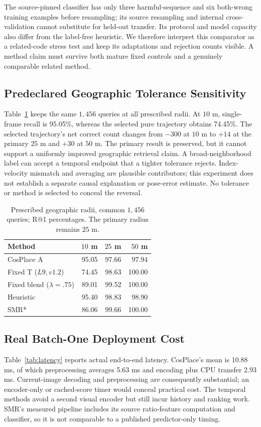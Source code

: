 \documentclass[conference]{IEEEtran}
\begin{document}
The source-pinned classifier has only three harmful-sequence and six both-wrong training examples before resampling; its source resampling and internal cross-validation cannot substitute for held-out transfer. Its protocol and model capacity also differ from the label-free heuristic. We therefore interpret this comparator as a related-code stress test and keep its adaptations and rejection counts visible. A method claim must survive both mature fixed controls and a genuinely comparable related method.

\subsection{Predeclared Geographic Tolerance Sensitivity}
Table~\ref{tab:radius} keeps the same $1,456$ queries at all prescribed radii. At $10$ m, single-frame recall is 95.05\%, whereas the selected pure trajectory obtains 74.45\%. The selected trajectory's net correct count changes from $-300$ at $10$ m to $+14$ at the primary $25$ m and $+30$ at $50$ m. The primary result is preserved, but it cannot support a uniformly improved geographic retrieval claim. A broad-neighborhood label can accept a temporal endpoint that a tighter tolerance rejects. Index-velocity mismatch and averaging are plausible contributors; this experiment does not establish a separate causal explanation or pose-error estimate. No tolerance or method is selected to conceal the reversal.
\begin{table}[t]\centering\small
\caption{Prescribed geographic radii, common $1,456$ queries; R@1 percentages. The primary radius remains $25$ m.}\label{tab:radius}
\begin{tabular}{lrrr}\toprule Method & $10$ m & $25$ m & $50$ m\\\midrule
CosPlace A & 95.05 & 97.66 & 97.94\\
Fixed T ($L9,v1.2$) & 74.45 & 98.63 & 100.00\\
Fixed blend ($\lambda=.75$) & 89.01 & 99.52 & 100.00\\
Heuristic & 95.40 & 98.83 & 98.90\\
SMR* & 86.06 & 99.66 & 100.00\\
\bottomrule\end{tabular}\end{table}

\subsection{Real Batch-One Deployment Cost}
Table~\ref{tab:latency} reports actual end-to-end latency. CosPlace's mean is 10.88 ms, of which preprocessing averages 5.63 ms and encoding plus CPU transfer 2.93 ms. Current-image decoding and preprocessing are consequently substantial; an encoder-only or cached-score timer would conceal practical cost. The temporal methods avoid a second visual encoder but still incur history and ranking work. SMR's measured pipeline includes its source ratio-feature computation and classifier, so it is not comparable to a published predictor-only timing.
\end{document}
